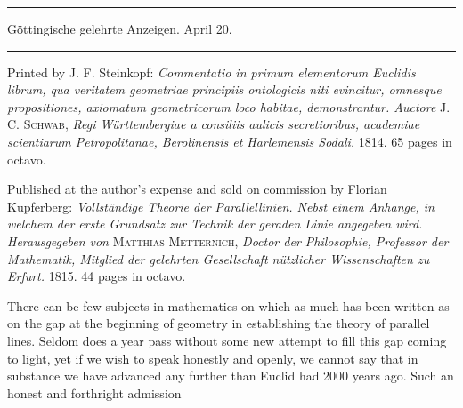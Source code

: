 \clearpage
{}\begin{center}
{\Large{}}
\end{center}

\bigskip
\hrule
\begin{center}
Göttingische gelehrte Anzeigen.  April 20.
\end{center}
\hrule

\bigskip
\begin{center}
{\large{}}
\end{center}

Printed by J. F. Steinkopf: \emph{Commentatio in primum elementorum Euclidis librum,
qua veritatem geometriae principiis ontologicis niti evincitur, omnesque
  propositiones, axiomatum geometricorum loco habitae, demonstrantur. Auctore}
  J. C. \textsc{Schwab}, \emph{Regi Württembergiae a consiliis aulicis
secretioribus, academiae scientiarum Petropolitanae, Berolinensis et Harlemensis
Sodali.} 1814. 65 pages in octavo.

\begin{center}
{\large{}}
\end{center}

Published at the author's expense and sold on commission by Florian Kupferberg:
\emph{Vollständige Theorie der Parallellinien. Nebst einem Anhange, in welchem
der erste Grundsatz zur Technik der geraden Linie angegeben wird. Herausgegeben
von} \textsc{Matthias Metternich}, \emph{Doctor der Philosophie, Professor der
Mathematik, Mitglied der gelehrten Gesellschaft nützlicher Wissenschaften zu
Erfurt.} 1815. 44 pages in octavo.

There can be few subjects in mathematics on which as much has been
written as on the gap at the beginning of geometry in establishing the
theory of parallel lines. Seldom does a year pass without some new
attempt to fill this gap coming to light, yet if we wish to speak
honestly and openly, we cannot say that in substance we have advanced any
further than Euclid had 2000 years ago. Such an
honest and forthright admission

